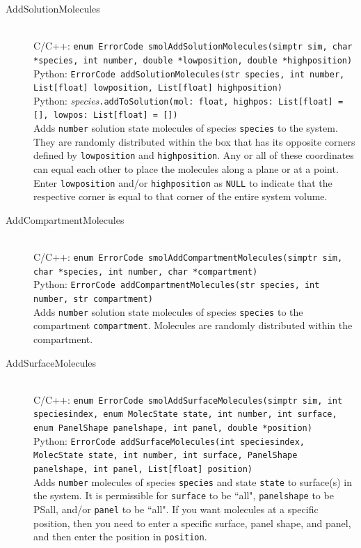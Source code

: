 \documentclass {book}
\newcommand {\ttt} {\texttt}
\begin{document}
\begin{description}
\item[AddSolutionMolecules]
\hfill \\
C/C++: \ttt{enum ErrorCode smolAddSolutionMolecules(simptr sim, char *species, int number, double *lowposition, double *highposition)}\\
Python: \ttt{ErrorCode addSolutionMolecules(str species, int number, List[float] lowposition, List[float] highposition)}\\
Python: \textit{species}\ttt{.addToSolution(mol: float, highpos: List[float] = [], lowpos: List[float] = [])}\\
Adds \ttt{number} solution state molecules of species \ttt{species} to the system. They are randomly distributed within the box that has its opposite corners defined by \ttt{lowposition} and \ttt{highposition}. Any or all of these coordinates can equal each other to place the molecules along a plane or at a point. Enter \ttt{lowposition} and/or \ttt{highposition} as \ttt{NULL} to indicate that the respective corner is equal to that corner of the entire system volume.

\item[AddCompartmentMolecules]
\hfill \\
C/C++: \ttt{enum ErrorCode smolAddCompartmentMolecules(simptr sim, char *species, int number, char *compartment)}\\
Python: \ttt{ErrorCode addCompartmentMolecules(str species, int number, str compartment)}\\
Adds \ttt{number} solution state molecules of species \ttt{species} to the compartment \ttt{compartment}. Molecules are randomly distributed within the compartment.

\item[AddSurfaceMolecules]
\hfill \\
C/C++: \ttt{enum ErrorCode smolAddSurfaceMolecules(simptr sim, int speciesindex, enum MolecState state, int number, int surface, enum PanelShape panelshape, int panel, double *position)}\\
Python: \ttt{ErrorCode addSurfaceMolecules(int speciesindex, MolecState state, int number, int surface, PanelShape panelshape, int panel, List[float] position)}\\
Adds \ttt{number} molecules of species \ttt{species} and state \ttt{state} to surface(s) in the system. It is permissible for \ttt{surface} to be ``all", \ttt{panelshape} to be PSall, and/or \ttt{panel} to be ``all". If you want molecules at a specific position, then you need to enter a specific surface, panel shape, and panel, and then enter the position in \ttt{position}.


\end{description}
\end{document}
